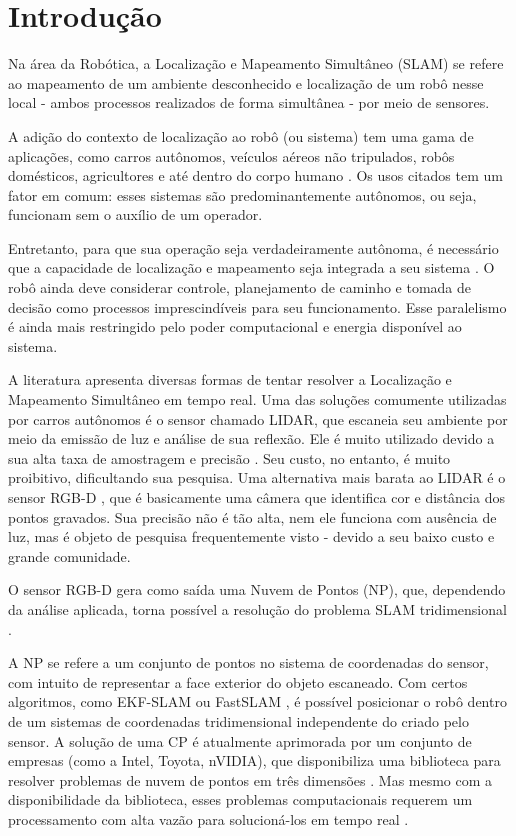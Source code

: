 	\chapter*[Introdução]{Introdução}

	Na área da Robótica, a Localização e Mapeamento Simultâneo (SLAM) se refere ao mapeamento de um ambiente desconhecido e localização de um robô nesse local - ambos processos realizados de forma simultânea - por meio de sensores.
	
	A adição do contexto de localização ao robô (ou sistema) tem uma gama de aplicações, como carros autônomos, veículos aéreos não tripulados, robôs domésticos, agricultores e até dentro do corpo humano \cite{bao2014simultaneous}. Os usos citados tem um fator em comum: esses sistemas são predominantemente autônomos, ou seja, funcionam sem o auxílio de um operador.
	
	Entretanto, para que sua operação seja verdadeiramente autônoma, é necessário que a capacidade de localização e mapeamento seja integrada a seu sistema \cite{nikolic2014synchronized}. O robô ainda deve considerar controle, planejamento de caminho e tomada de decisão como processos imprescindíveis para seu funcionamento. Esse paralelismo é ainda mais restringido pelo poder computacional e energia disponível ao sistema.
	
	A literatura apresenta diversas formas de tentar resolver a Localização e Mapeamento Simultâneo em tempo real. Uma das soluções comumente utilizadas por carros autônomos é o sensor chamado LIDAR, que escaneia seu ambiente por meio da emissão de luz e análise de sua reflexão. Ele é muito utilizado devido a sua alta taxa de amostragem e precisão \cite{wolcott2017robust}. Seu custo, no entanto, é muito proibitivo, dificultando sua pesquisa. Uma alternativa mais barata ao LIDAR é o sensor RGB-D \cite{sturm2012benchmark}, que é basicamente uma câmera que identifica cor e distância dos pontos gravados. Sua precisão não é tão alta, nem ele funciona com ausência de luz, mas é objeto de pesquisa frequentemente visto - devido a seu baixo custo e grande comunidade. 
	
	O sensor RGB-D gera como saída uma Nuvem de Pontos (NP), que, dependendo da análise aplicada, torna possível a resolução do problema SLAM tridimensional \cite{henry2012rgb}. 	
	
	A NP se refere a um conjunto de pontos no sistema de coordenadas do sensor, com intuito de representar a face exterior do objeto escaneado. Com certos algoritmos, como EKF-SLAM ou FastSLAM \cite{durrant2006simultaneous}, é possível posicionar o robô dentro de um sistemas de coordenadas tridimensional independente do criado pelo sensor. A solução de uma CP é atualmente aprimorada por um conjunto de empresas (como a Intel, Toyota, nVIDIA), que disponibiliza uma biblioteca para resolver problemas de nuvem de pontos em três dimensões \cite{Rusu_ICRA2011_PCL}. Mas mesmo com a disponibilidade da biblioteca, esses problemas computacionais requerem um processamento com alta vazão para solucioná-los em tempo real \cite{clipp2010parallel}.
		
